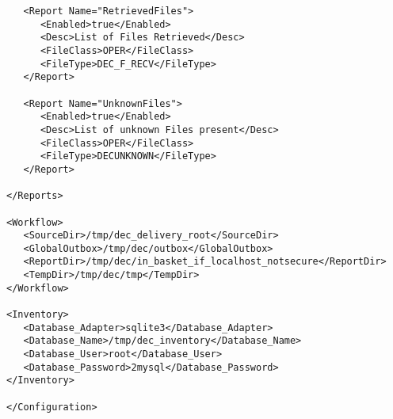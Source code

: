 \documentclass[dec_sum_main.tex]{subfiles}
\begin{document}
\begin{verbatim}
   <Report Name="RetrievedFiles">
      <Enabled>true</Enabled>
      <Desc>List of Files Retrieved</Desc>
      <FileClass>OPER</FileClass>
      <FileType>DEC_F_RECV</FileType>
   </Report>

   <Report Name="UnknownFiles">
      <Enabled>true</Enabled>
      <Desc>List of unknown Files present</Desc>
      <FileClass>OPER</FileClass>
      <FileType>DECUNKNOWN</FileType>
   </Report>

</Reports>

<Workflow>
   <SourceDir>/tmp/dec_delivery_root</SourceDir>
   <GlobalOutbox>/tmp/dec/outbox</GlobalOutbox>
   <ReportDir>/tmp/dec/in_basket_if_localhost_notsecure</ReportDir>
   <TempDir>/tmp/dec/tmp</TempDir>
</Workflow>

<Inventory>
   <Database_Adapter>sqlite3</Database_Adapter>
   <Database_Name>/tmp/dec_inventory</Database_Name>
   <Database_User>root</Database_User>
   <Database_Password>2mysql</Database_Password>
</Inventory>

</Configuration>


\end{verbatim}
\end{document}
